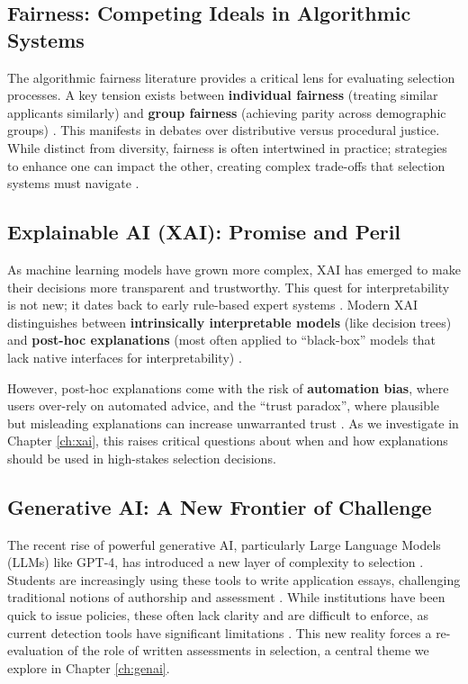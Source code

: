 \subsection{Fairness: Competing Ideals in Algorithmic Systems}\label{ssec:context_fairness}
The algorithmic fairness literature provides a critical lens for evaluating selection processes. A key tension exists between \textbf{individual fairness} (treating similar applicants similarly) and \textbf{group fairness} (achieving parity across demographic groups) \cite{dwork_fairness_2012, pmlr-v80-kearns18a}. This manifests in debates over distributive versus procedural justice. While distinct from diversity, fairness is often intertwined in practice; strategies to enhance one can impact the other, creating complex trade-offs that selection systems must navigate \cite{zhao2023fairness}.

\subsection{Explainable AI (XAI): Promise and Peril}\label{ssec:context_xai}
As machine learning models have grown more complex, XAI has emerged to make their decisions more transparent and trustworthy. This quest for interpretability is not new; it dates back to early rule-based expert systems \cite{shortliffe_mycin_1976}. Modern XAI distinguishes between \textbf{intrinsically interpretable models} (like decision trees) and \textbf{post-hoc explanations} (most often applied to ``black-box'' models that lack native interfaces for interpretability) \cite{molnar_interpretable_2019, rudin_stop_2019}.

However, post-hoc explanations come with the risk of \textbf{automation bias}, where users over-rely on automated advice, and the ``trust paradox'', where plausible but misleading explanations can increase unwarranted trust \cite{mosier_automation_1996, lai_human_2019}. As we investigate in Chapter \ref{ch:xai}, this raises critical questions about when and how explanations should be used in high-stakes selection decisions.

\subsection{Generative AI: A New Frontier of Challenge}\label{ssec:context_genai}
The recent rise of powerful generative AI, particularly Large Language Models (LLMs) like GPT-4, has introduced a new layer of complexity to selection \cite{ashish_vaswani_attention_2017, openai_gpt-4_2023}. Students are increasingly using these tools to write application essays, challenging traditional notions of authorship and assessment \cite{dehouche_plagiarism_2021}. While institutions have been quick to issue policies, these often lack clarity and are difficult to enforce, as current detection tools have significant limitations \cite{MikePerkins_JasperRoe_2023, mitchell_detectgpt_2023}. This new reality forces a re-evaluation of the role of written assessments in selection, a central theme we explore in Chapter \ref{ch:genai}.

